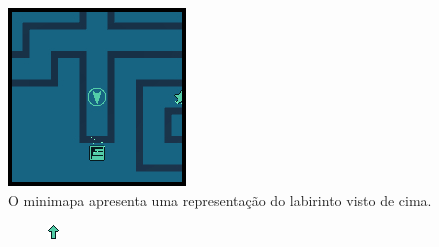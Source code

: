 \begin{figure}[h!]
 \centering
  \includegraphics[width=0.4\linewidth]{minimap.jpg}
  \caption{O minimapa apresenta uma representação do labirinto visto de cima.}
  \label{fig:minimapa1}
\end{figure}

\begin{figure}[h!]
  \centering
  \begin{subfigure}[b]{0.1\linewidth}
    \includegraphics[width=\linewidth]{icon1.jpg}
  \end{subfigure}

\end{figure}
